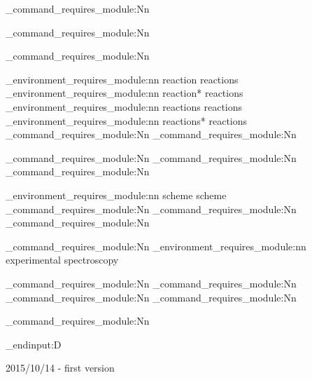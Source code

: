 \chemmacros_command_requires_module:Nn 

\chemmacros_command_requires_module:Nn 

\chemmacros_command_requires_module:Nn 

\chemmacros_environment_requires_module:nn {reaction}       {reactions}
\chemmacros_environment_requires_module:nn {reaction*}      {reactions}
\chemmacros_environment_requires_module:nn {reactions}      {reactions}
\chemmacros_environment_requires_module:nn {reactions*}     {reactions}
\chemmacros_command_requires_module:Nn     
\chemmacros_command_requires_module:Nn     

\chemmacros_command_requires_module:Nn 
\chemmacros_command_requires_module:Nn 
\chemmacros_command_requires_module:Nn 

\chemmacros_environment_requires_module:nn {scheme}        {scheme}
\chemmacros_command_requires_module:Nn     
\chemmacros_command_requires_module:Nn     
\chemmacros_command_requires_module:Nn     

\chemmacros_command_requires_module:Nn     
\chemmacros_environment_requires_module:nn {experimental} {spectroscopy}

\chemmacros_command_requires_module:Nn 
\chemmacros_command_requires_module:Nn 
\chemmacros_command_requires_module:Nn 
\chemmacros_command_requires_module:Nn 

\chemmacros_command_requires_module:Nn 


\tex_endinput:D

2015/10/14 - first version

